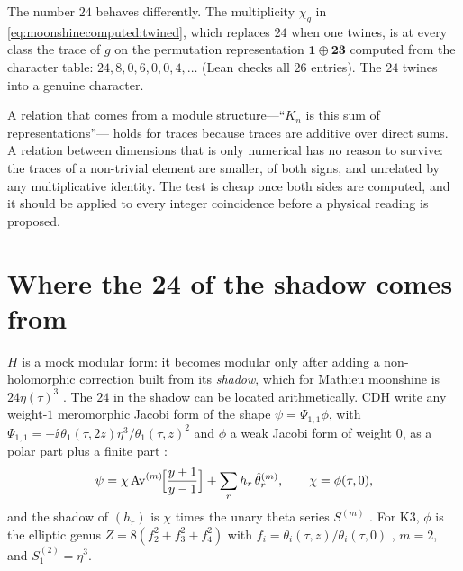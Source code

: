 The number $24$ behaves differently. The multiplicity $\chi_g$ in
\eqref{eq:moonshinecomputed:twined}, which replaces $24$ when one twines, is at every class
the trace of $g$ on the permutation representation $\mathbf1\oplus\mathbf{23}$ computed
from the character table: $24,8,0,6,0,0,4,\dots$ (Lean checks all $26$ entries). The
$24$ twines into a genuine character.

\begin{physicsbox}
A relation that comes from a module structure---``$K_n$ is this sum of representations''---
holds for traces because traces are additive over direct sums. A relation between
dimensions that is only numerical has no reason to survive: the traces of a non-trivial
element are smaller, of both signs, and unrelated by any multiplicative identity. The test
is cheap once both sides are computed, and it should be applied to every integer
coincidence before a physical reading is proposed.
\end{physicsbox}

\section{Where the 24 of the shadow comes from}\label{sec:moonshinecomputed:shadow}

$H$ is a mock modular form: it becomes modular only after adding a non-holomorphic
correction built from its \emph{shadow}, which for Mathieu moonshine is
$24\eta(\tau)^3$ .
The $24$ in the shadow can be located arithmetically. CDH write any weight-$1$
meromorphic Jacobi form of the shape $\psi=\Psi_{1,1}\phi$, with
$\Psi_{1,1}=-\ii\,\theta_1(\tau,2z)\eta^3/\theta_1(\tau,z)^2$ and $\phi$ a weak Jacobi form
of weight $0$, as a polar part plus a finite part :
\begin{equation}\label{eq:moonshinecomputed:polar}
  \psi=\chi\,\mathrm{Av}^{(m)}\!\Bigl[\frac{y+1}{y-1}\Bigr]+\sum_rh_r\,\hat\theta_r^{(m)},
  \qquad \chi=\phi(\tau,0),
\end{equation}
and the shadow of $(h_r)$ is $\chi$ times the unary theta series $S^{(m)}$
. For K3, $\phi$ is the elliptic genus
$Z=8(f_2^2+f_3^2+f_4^2)$ with $f_i=\theta_i(\tau,z)/\theta_i(\tau,0)$ , $m=2$, and $S^{(2)}_1=\eta^3$.

